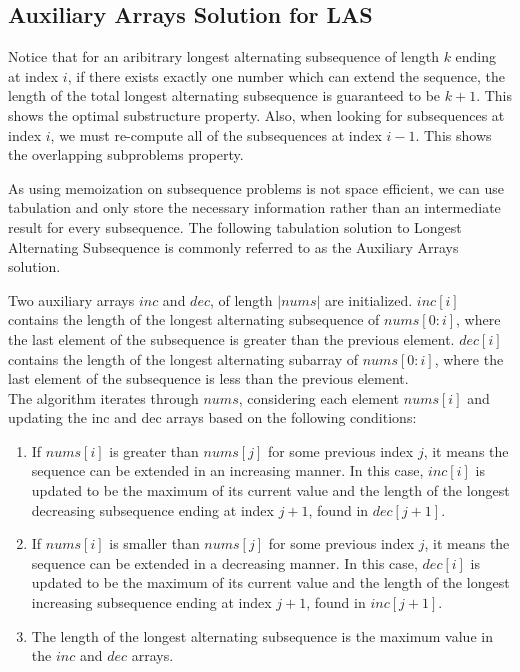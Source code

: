 \subsection{Auxiliary Arrays Solution for LAS}
Notice that for an aribitrary longest alternating subsequence of length $k$ ending at index $i$,
if there exists exactly one number which can extend the sequence,
the length of the total longest alternating subsequence is guaranteed to be $k+1$.
This shows the optimal substructure property.
Also, when looking for subsequences at index $i$,
we must re-compute all of the subsequences at index $i-1$.
This shows the overlapping subproblems property.

As using memoization on subsequence problems is not space efficient,
we can use tabulation and only store the necessary information rather than an intermediate result for every subsequence.
The following tabulation solution to Longest Alternating Subsequence is commonly referred to as the Auxiliary Arrays solution.

Two auxiliary arrays $inc$ and $dec$, of length $|nums|$ are initialized.
$inc[i]$ contains the length of the longest alternating subsequence of $nums[0:i]$,
where the last element of the subsequence is greater than the previous element.
$dec[i]$ contains the length of the longest alternating subarray of $nums[0:i]$,
where the last element of the subsequence is less than the previous element.\\

The algorithm iterates through $nums$, considering each element $nums[i]$ and updating the inc and dec arrays based on the following conditions:
\newpage

\begin{enumerate}
    \item If $nums[i]$ is greater than $nums[j]$ for some previous index $j$, it means the sequence can be extended in an increasing manner.
    In this case, $inc[i]$ is updated to be the maximum of its current value and the length of the longest decreasing subsequence ending at index $j+1$, found in $dec[j+1]$.

    \item If $nums[i]$ is smaller than $nums[j]$ for some previous index $j$, it means the sequence can be extended in a decreasing manner.
    In this case, $dec[i]$ is updated to be the maximum of its current value and the length of the longest increasing subsequence ending at index $j+1$, found in $inc[j+1]$.

    \item The length of the longest alternating subsequence is the maximum value in the $inc$ and $dec$ arrays.
\end{enumerate}


